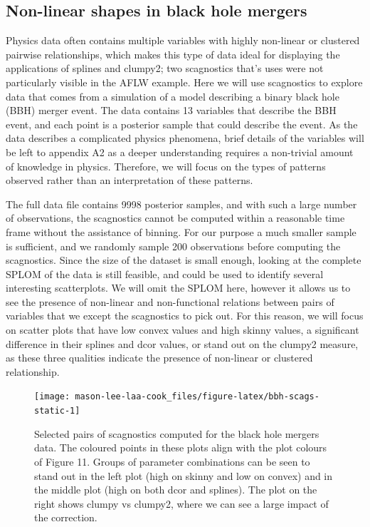 \hypertarget{non-linear-shapes-in-black-hole-mergers}{%
\subsection{Non-linear shapes in black hole mergers}\label{non-linear-shapes-in-black-hole-mergers}}

Physics data often contains multiple variables with highly non-linear or clustered pairwise relationships, which makes this type of data ideal for displaying the applications of splines and clumpy2; two scagnostics that's uses were not particularly visible in the AFLW example. Here we will use scagnostics to explore data that comes from a simulation of a model describing a binary black hole (BBH) merger event. The data contains 13 variables that describe the BBH event, and each point is a posterior sample that could describe the event. As the data describes a complicated physics phenomena, brief details of the variables will be left to appendix A2 as a deeper understanding requires a non-trivial amount of knowledge in physics. Therefore, we will focus on the types of patterns observed rather than an interpretation of these patterns.

The full data file contains 9998 posterior samples, and with such a large number of observations, the scagnostics cannot be computed within a reasonable time frame without the assistance of binning. For our purpose a much smaller sample is sufficient, and we randomly sample 200 observations before computing the scagnostics. Since the size of the dataset is small enough, looking at the complete SPLOM of the data is still feasible, and could be used to identify several interesting scatterplots. We will omit the SPLOM here, however it allows us to see the presence of non-linear and non-functional relations between pairs of variables that we except the scagnostics to pick out. For this reason, we will focus on scatter plots that have low convex values and high skinny values, a significant difference in their splines and dcor values, or stand out on the clumpy2 measure, as these three qualities indicate the presence of non-linear or clustered relationship.

\begin{figure}
\texttt{[image: mason-lee-laa-cook\_files/figure-latex/bbh-scags-static-1]} \caption{Selected pairs of scagnostics computed for the black hole mergers data. The coloured points in these plots align with the plot colours of Figure 11. Groups of parameter combinations can be seen to stand out in the left plot (high on skinny and low on convex) and in the middle plot (high on both dcor and splines). The plot on the right shows clumpy vs clumpy2, where we can see a large impact of the correction. }\label{fig:bbh-scags-static}
\end{figure}

